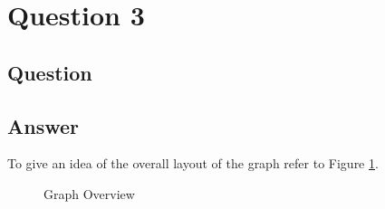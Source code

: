\section{Question 3}

\subsection{Question}


\subsection{Answer}
To give an idea of the overall layout of the graph refer to Figure \ref{fig:overview}. 

\begin{figure}[h!]
\centering
{}
\caption{Graph Overview}
\label{fig:overview}
\end{figure}

